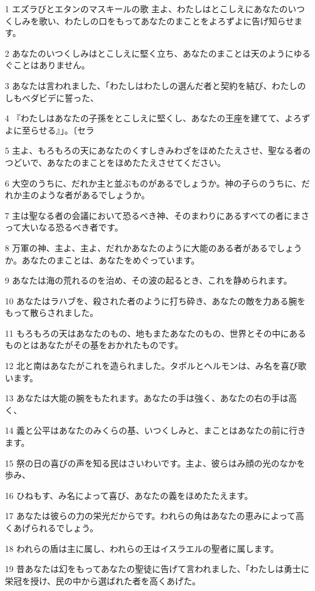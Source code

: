 \par 1 エズラびとエタンのマスキールの歌 主よ、わたしはとこしえにあなたのいつくしみを歌い、わたしの口をもってあなたのまことをよろずよに告げ知らせます。
\par 2 あなたのいつくしみはとこしえに堅く立ち、あなたのまことは天のようにゆるぐことはありません。
\par 3 あなたは言われました、「わたしはわたしの選んだ者と契約を結び、わたしのしもべダビデに誓った、
\par 4 『わたしはあなたの子孫をとこしえに堅くし、あなたの王座を建てて、よろずよに至らせる』」。〔セラ
\par 5 主よ、もろもろの天にあなたのくすしきみわざをほめたたえさせ、聖なる者のつどいで、あなたのまことをほめたたえさせてください。
\par 6 大空のうちに、だれか主と並ぶものがあるでしょうか。神の子らのうちに、だれか主のような者があるでしょうか。
\par 7 主は聖なる者の会議において恐るべき神、そのまわりにあるすべての者にまさって大いなる恐るべき者です。
\par 8 万軍の神、主よ、主よ、だれかあなたのように大能のある者があるでしょうか。あなたのまことは、あなたをめぐっています。
\par 9 あなたは海の荒れるのを治め、その波の起るとき、これを静められます。
\par 10 あなたはラハブを、殺された者のように打ち砕き、あなたの敵を力ある腕をもって散らされました。
\par 11 もろもろの天はあなたのもの、地もまたあなたのもの、世界とその中にあるものとはあなたがその基をおかれたものです。
\par 12 北と南はあなたがこれを造られました。タボルとヘルモンは、み名を喜び歌います。
\par 13 あなたは大能の腕をもたれます。あなたの手は強く、あなたの右の手は高く、
\par 14 義と公平はあなたのみくらの基、いつくしみと、まことはあなたの前に行きます。
\par 15 祭の日の喜びの声を知る民はさいわいです。主よ、彼らはみ顔の光のなかを歩み、
\par 16 ひねもす、み名によって喜び、あなたの義をほめたたえます。
\par 17 あなたは彼らの力の栄光だからです。われらの角はあなたの恵みによって高くあげられるでしょう。
\par 18 われらの盾は主に属し、われらの王はイスラエルの聖者に属します。
\par 19 昔あなたは幻をもってあなたの聖徒に告げて言われました、「わたしは勇士に栄冠を授け、民の中から選ばれた者を高くあげた。
